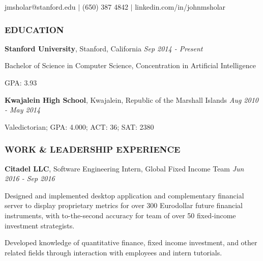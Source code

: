 \documentclass[11pt,letterpaper]{article}%
\begin{document}
\selectfont

\vspace{-1ex}
\centerline{jmsholar@stanford.edu $|$ (650) 387 4842 $|$ linkedin.com/in/johnmsholar}
\vspace{-1ex}

\hrulefill
\subsubsection*{EDUCATION}
\vspace{-1ex}
\hrulefill
\small

\hspace{.6em} 
{\bf Stanford University}, Stanford, California \hfill \textit{Sep 2014 - Present}

\hspace{1.2em} 
{Bachelor of Science} in Computer Science, Concentration in Artificial Intelligence 

\hspace{1.2em} 
GPA: 3.93

\hspace{.6em} 
{\bf Kwajalein High School}, Kwajalein, Republic of the Marshall Islands \hfill \textit{Aug 2010 - May 2014}

\hspace{1.2em} 
Valedictorian; GPA: 4.000; ACT: 36; SAT: 2380

\vspace{-.5em}
\hrulefill 
\subsubsection*{WORK \& LEADERSHIP EXPERIENCE}
\vspace{-1ex}
\hrulefill

\vspace{.3em}
\hspace{.6em} 
{\bf Citadel LLC}, Software Engineering Intern, Global Fixed Income Team \hfill \textit{Jun 2016 - Sep 2016}
\vspace{-.4em}
\begin{itemize*}
\item 
Designed and implemented desktop application and complementary financial server  to display proprietary metrics for over 300 Eurodollar future financial instruments, with to-the-second accuracy for team of over 50 fixed-income investment strategists.
\item
Developed knowledge of quantitative finance, fixed income investment, and other related fields through interaction with employees and intern tutorials.
\end{itemize*}
\end{document}
